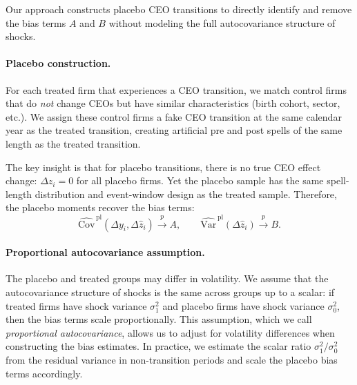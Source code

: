 \documentclass[11pt,a4paper]{article}
\newcommand{\Var}{\text{Var}}
\newcommand{\Cov}{\text{Cov}}
\begin{document}
Our approach constructs placebo CEO transitions to directly identify and remove the bias terms $A$ and $B$ without modeling the full autocovariance structure of shocks.

\paragraph{Placebo construction.} For each treated firm that experiences a CEO transition, we match control firms that do \emph{not} change CEOs but have similar characteristics (birth cohort, sector, etc.). We assign these control firms a fake CEO transition at the same calendar year as the treated transition, creating artificial pre and post spells of the same length as the treated transition.

The key insight is that for placebo transitions, there is no true CEO effect change: $\Delta z_i = 0$ for all placebo firms. Yet the placebo sample has the same spell-length distribution and event-window design as the treated sample. Therefore, the placebo moments recover the bias terms:
\begin{equation}
\widehat{\Cov}^{\,\text{pl}}(\Delta y_i,\Delta \hat z_i) \xrightarrow{p} A,\qquad \widehat{\Var}^{\,\text{pl}}(\Delta \hat z_i) \xrightarrow{p} B.
\end{equation}

\paragraph{Proportional autocovariance assumption.} The placebo and treated groups may differ in volatility. We assume that the autocovariance structure of shocks is the same across groups up to a scalar: if treated firms have shock variance $\sigma_1^2$ and placebo firms have shock variance $\sigma_0^2$, then the bias terms scale proportionally. This assumption, which we call \emph{proportional autocovariance}, allows us to adjust for volatility differences when constructing the bias estimates. In practice, we estimate the scalar ratio $\sigma_1^2/\sigma_0^2$ from the residual variance in non-transition periods and scale the placebo bias terms accordingly.
\end{document}

